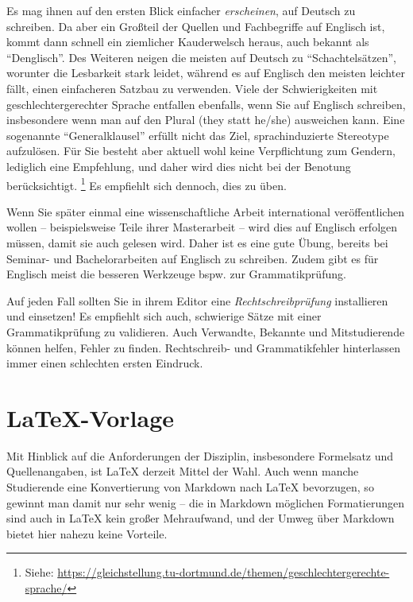 Es mag ihnen auf den ersten Blick einfacher \emph{erscheinen}, auf Deutsch zu schreiben.
Da aber ein Großteil der Quellen und Fachbegriffe auf Englisch ist, kommt dann schnell ein ziemlicher Kauderwelsch heraus,
auch bekannt als \enquote{Denglisch}. Des Weiteren neigen die meisten auf
Deutsch zu \enquote{Schachtelsätzen}, worunter die Lesbarkeit stark leidet,
während es auf Englisch den meisten leichter fällt, einen einfacheren Satzbau
zu verwenden.
Viele der Schwierigkeiten mit geschlechtergerechter Sprache entfallen
ebenfalls, wenn Sie auf Englisch schreiben, insbesondere wenn man auf den
Plural (they statt he/she) ausweichen kann.
Eine sogenannte \enquote{Generalklausel} erfüllt nicht das Ziel,
sprachinduzierte Stereotype aufzulösen.
Für Sie besteht aber aktuell wohl keine Verpflichtung zum Gendern, lediglich
eine Empfehlung, und daher wird dies nicht bei der Benotung berücksichtigt.%
\footnote{Siehe: \url{https://gleichstellung.tu-dortmund.de/themen/geschlechtergerechte-sprache/}}
Es empfiehlt sich dennoch, dies zu üben.

Wenn Sie später einmal eine wissenschaftliche Arbeit international
veröffentlichen wollen -- beispielsweise Teile ihrer Masterarbeit --
wird dies auf Englisch erfolgen müssen, damit sie auch gelesen wird.
Daher ist es eine gute Übung, bereits bei Seminar- und Bachelorarbeiten auf Englisch zu schreiben.
Zudem gibt es für Englisch meist die besseren Werkzeuge bspw.{} zur Grammatikprüfung.

Auf jeden Fall sollten Sie in ihrem Editor eine \emph{Rechtschreibprüfung} installieren und einsetzen!
Es empfiehlt sich auch, schwierige Sätze mit einer Grammatikprüfung zu validieren.
Auch Verwandte, Bekannte und Mitstudierende können helfen, Fehler zu finden.
Rechtschreib- und Grammatikfehler hinterlassen immer einen schlechten ersten Eindruck.

\section{\LaTeX{}-Vorlage}

Mit Hinblick auf die Anforderungen der Disziplin, insbesondere Formelsatz
und Quellenangaben, ist \LaTeX{} derzeit Mittel der Wahl.
Auch wenn manche Studierende eine Konvertierung von Markdown nach \LaTeX{} bevorzugen,
so gewinnt man damit nur sehr wenig -- die in Markdown möglichen Formatierungen sind
auch in \LaTeX{} kein großer Mehraufwand, und der Umweg über Markdown bietet
hier nahezu keine Vorteile.

